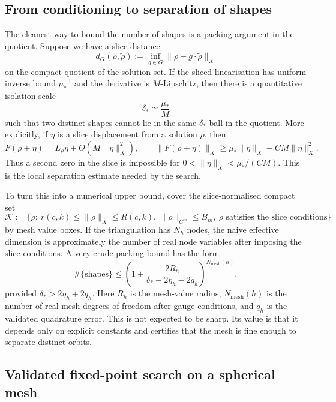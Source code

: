 \documentclass[12pt]{article}
\begin{document}
\subsection{From conditioning to separation of shapes}

The cleanest way to bound the number of shapes is a packing argument in the
quotient. Suppose we have a slice distance
\[
  d_G(\rho,\tilde\rho):=\inf_{g\in G}\|\rho-g\cdot\tilde\rho\|_X
\]
on the compact quotient of the solution set. If the sliced linearisation has
uniform inverse bound $\mu_*^{-1}$ and the derivative is $M$-Lipschitz, then
there is a quantitative isolation scale
\[
  \delta_* \simeq \frac{\mu_*}{M}
\]
such that two distinct shapes cannot lie in the same $\delta_*$-ball in the
quotient. More explicitly, if $\eta$ is a slice displacement from a solution
$\rho$, then
\[
  F(\rho+\eta)=L_\rho\eta+O(M\|\eta\|_X^2),
  \qquad
  \|F(\rho+\eta)\|_X
    \geq \mu_*\|\eta\|_X-CM\|\eta\|_X^2.
\]
Thus a second zero in the slice is impossible for
$0<\|\eta\|_X<\mu_*/(CM)$. This is the local separation estimate needed by the
search.

To turn this into a numerical upper bound, cover the slice-normalised compact
set
\[
  \mathcal K:=\{\rho:\ r(c,k)\leq\|\rho\|_X\leq R(c,k),\
      \|\rho\|_{C^m}\leq B_m,\ \rho\text{ satisfies the slice conditions}\}
\]
by mesh value boxes. If the triangulation has $N_h$ nodes, the naive effective
dimension is approximately the number of real node variables after imposing
the slice conditions. A very crude packing bound has the form
\[
  \#\{\text{shapes}\}
  \leq
  \left(1+\frac{2R_h}{\delta_*-2\eta_h-2q_h}\right)^{N_{\mathrm{mesh}}(h)},
\]
provided $\delta_*>2\eta_h+2q_h$. Here $R_h$ is the mesh-value radius,
$N_{\mathrm{mesh}}(h)$ is the number of real mesh degrees of freedom after
gauge conditions, and $q_h$ is the validated quadrature error. This is not
expected to be sharp. Its value is that it depends only on explicit constants
and certifies that the mesh is fine enough to separate distinct orbits.

\subsection{Validated fixed-point search on a spherical mesh}
\end{document}
